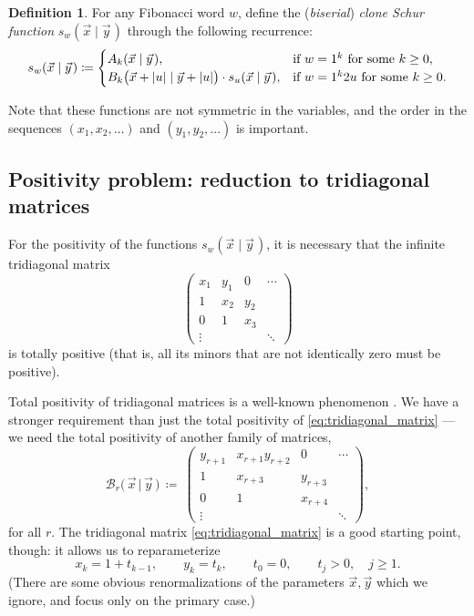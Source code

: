 \documentclass[letterpaper,11pt,oneside,reqno]{article}
\numberwithin{equation}{section}
\newcommand{\ssp}{\hspace{1pt}}
\theoremstyle{definition}
\newtheorem{definition}[proposition]{Definition}
\begin{document}
\begin{definition}
	\label{def:clone_Schur}
	For any Fibonacci word $w$,
	define the
	(\emph{biserial})
	\emph{clone Schur function} $s_w(\vec{x} \mid \vec{y}\ssp)$ through the following recurrence:
	\begin{equation}
		\label{eq:clone_Schur_recurrence_def}
		s_w (\vec{x} \mid \vec{y}\ssp)
		\coloneqq
		\begin{cases}
			A_k(\vec{x} \mid \vec{y}\ssp), & \textnormal{if $w=1^{k}$ for some $k\ge 0$},\\
			B_k\bigl( \vec{x}+|u| \mid \vec{y}+|u| \bigr)\cdot s_u (\vec{x} \mid \vec{y}\ssp)
			, & \textnormal{if $w=1^k2u$ for some $k\ge 0$}.
		\end{cases}
	\end{equation}
\end{definition}
Note that these functions are not symmetric in the variables,
and the order in the sequences $(x_1,x_2,\ldots)$ and $(y_1,y_2,\ldots)$ is important.

\subsection{Positivity problem: reduction to tridiagonal matrices}

For the positivity of the functions
$s_w(\vec{x} \mid \vec{y}\ssp)$, it is necessary that the 
infinite
tridiagonal matrix 
\begin{equation}
	\label{eq:tridiagonal_matrix}
	\begin{pmatrix}
	x_1 & y_1 & 0 & \cdots\\
	1 & x_2 & y_2 &\\
	0 & 1 & x_3  & \\
	\vdots & & & \ddots
	\end{pmatrix}
\end{equation}
is totally positive (that is, all its minors that are not
identically zero must be positive).

Total positivity of tridiagonal matrices is a well-known phenomenon
\cite{FominZelevinsky1999}.
We have a stronger requirement than just the total positivity
of \eqref{eq:tridiagonal_matrix} --- we need the total positivity of
another family of matrices, 
\begin{equation*}
		\mathcal{B}_r \big( \, \vec{x} \, \big| \, \vec{y} \, \big) \, \coloneqq \
		\begin{pmatrix}
		y_{r+1} & x_{r+1} y_{r+2} & 0 & \cdots\\
		1 & x_{r+3} & y_{r+3} &\\
		0 & 1 & x_{r+4}  & \\
		\vdots & & & \ddots
	\end{pmatrix},
\end{equation*}
for all $r$. The tridiagonal matrix \eqref{eq:tridiagonal_matrix} is a good starting point,
though: it allows us to reparameterize
\begin{equation*}
	x_k=1+t_{k-1},\qquad y_k=t_k,\qquad t_0=0, \qquad t_j>0, \quad j\ge 1.
\end{equation*}
(There are some obvious renormalizations of the parameters 
$\vec x,\vec y$
which we ignore, and 
focus only on the primary case.)
\end{document}
